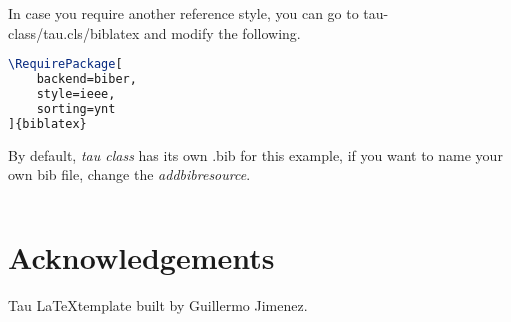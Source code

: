 \documentclass[9pt,a4paper,twoside]{tau-class/tau}
\begin{document}
        In case you require another reference style, you can go to tau-class/tau.cls/biblatex and modify the following.
		
\nolinenumbers
\begin{lstlisting}[language=TeX, caption=References style.]
\RequirePackage[
	backend=biber,
	style=ieee,
	sorting=ynt
]{biblatex}
\end{lstlisting}
\linenumbers

        By default, \textit{tau class} has its own .bib for this example, if you want to name your own bib file, change the \textit{addbibresource}.
		
\nolinenumbers
\begin{lstlisting}[language=TeX]

\end{lstlisting}
\linenumbers

\section{Acknowledgements}

Tau \LaTeX template built by Guillermo Jimenez.


\printbibliography

\end{document}

